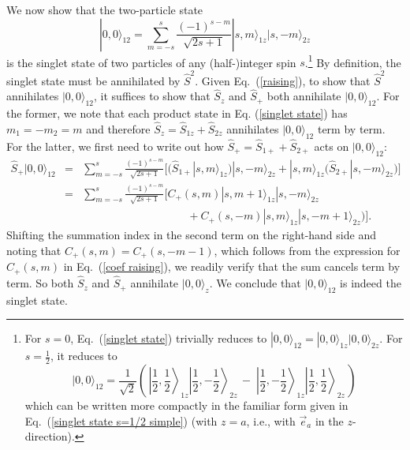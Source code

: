 We now show that the two-particle state 
\begin{equation}
|0,0\rangle_{\!12} = \sum_{m=-s}^s \frac{(-1)^{s-m}}{\sqrt{2s+1}} |s,m\rangle_{1z}|s,-m\rangle_{2z}
\label{singlet state}
\end{equation}
is the singlet state of two particles of any (half-)integer spin $s$.\footnote{For $s=0$, Eq.\ (\ref{singlet state}) trivially reduces to $|0, 0 \rangle_{\!12} = |0, 0 \rangle_{1z} |0, 0 \rangle_{2z}$. For $s=\frac12$, it reduces to
$$\textstyle |0, 0 \rangle_{\!12} = \dfrac{1}{\sqrt{2}} 
\left( \,
\left| \frac12, \frac12 \right\rangle_{\!1z} \left| \frac12, -\frac12 \right\rangle_{\!2z} \, - \; 
\left| \frac12, -\frac12 \right\rangle_{\!1z} \left| \frac12, \frac12 \right\rangle_{\!2z} \,
\right)
$$
which can be written more compactly in the familiar form given in Eq.\ (\ref{singlet state s=1/2 simple}) (with $z=a$, i.e., with $\vec{e}_a$ in the $z$-direction).\label{singlet note}}  By definition, the singlet state must be annihilated by $\hat{S}^2$. Given Eq.\ (\ref{raising}), to show that $\hat{S}^2$ annihilates $|0,0\rangle_{12}$, it suffices to show that $\hat{S}_z$ and $\hat{S}_+$ both annihilate $|0,0\rangle_{12}$. For the former, we note that each product state in Eq. (\ref{singlet state}) has $m_1=-m_2=m$ and therefore $\hat{S}_z = \hat{S}_{1z} + \hat{S}_{2z}$ annihilates $|0,0\rangle_{12}$ term by term. For the latter, we first need to write out how $\hat{S}_+ = \hat{S}_{1+}+\hat{S}_{2+}$ acts on $|0,0\rangle_{12}$:
\begin{eqnarray}
\hat{S}_+ |0,0\rangle_{12}
&\!\!=\!\!&  \sum_{m=-s}^s \frac{(-1)^{s-m}}{\sqrt{2s+1}}
\Big[\big(\hat{S}_{1+}|s,m\rangle_{1z}\big)|s,-m\rangle_{2z}+|s,m\rangle_{1z}\big(\hat{S}_{2+}|s,-m\rangle_{2z}\big)\Big] \nonumber \\[.2 cm] 
&\!\!=\!\!&  \sum_{m=-s}^s \frac{(-1)^{s-m}}{\sqrt{2s+1}}
\Big[C_+(s,m)|s,m\!+\!1\rangle_{1z}|s,-m\rangle_{2z} \nonumber \\
&&\hspace{4cm}+C_+(s,-m)|s,m\rangle_{1z}|s,-m\!+\!1\rangle_{2z})\Big].
\label{raising kills}
\end{eqnarray}
Shifting the summation index in the second term on the right-hand side and noting that $C_+(s,m)=C_+(s,-m-1)$, which follows from the expression for $C_+(s,m)$ in Eq.\ (\ref{coef raising}), we readily verify that the sum cancels term by term. So both $\hat{S}_z$ and $\hat{S}_+$ annihilate $|0,0\rangle_z$. We conclude that $|0,0\rangle_{12}$ is indeed the singlet state. 

